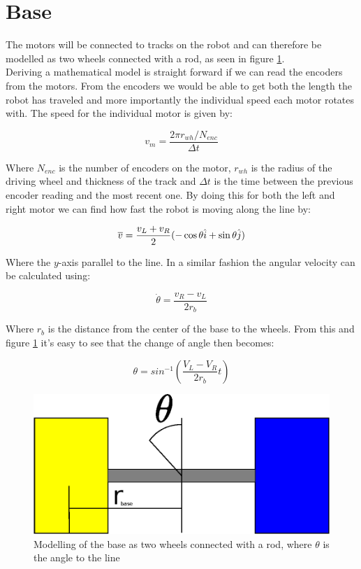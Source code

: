 \section*{Base}

The motors will be connected to tracks on the robot and can therefore be modelled as two wheels connected with a rod, as seen in figure \ref{fig:base_math_model}.\\ 
Deriving a mathematical model is straight forward if we can read the encoders from the motors. From the encoders we would be able to get both the length the robot has traveled and more importantly the individual speed each motor rotates with. The speed for the individual motor is given by: 

\begin{equation}
    v_m=\frac{2\pi r_{wh}/N_{enc}}{\Delta t}
    \label{eq:base_system_eq1}
\end{equation}

\noindent Where $N_{enc}$ is the number of encoders on the motor, $r_{wh}$ is the radius of the driving wheel and thickness of the track and $\Delta t$ is the time between the previous encoder reading and the most recent one. By doing this for both the left and right motor we can find how fast the robot is moving along the line by:

\begin{equation}
    \overline{v}= \frac{v_L+v_R}{2}(-\cos \theta \hat{i}+ \sin \theta \Hat{j})
\end{equation}

\noindent Where the $y$-axis parallel to the line. In a similar fashion the angular velocity can be calculated using:

\begin{equation}
    \Dot{\theta} = \frac{v_R-v_L}{2r_{b}}
    \label{eq:base_system_eq2}
\end{equation}

\noindent Where $r_{b}$ is the distance from the center of the base to the wheels. From this and figure \ref{fig:base_math_model} it's easy to see that the change of angle then becomes:

\begin{equation}
    \theta = sin^{-1}\left(\frac{V_L-V_R}{2r_{b}}t\right)
\end{equation}

\begin{figure}[H]
    \centering
    \includegraphics[width=0.7\columnwidth]{chapters/img/base_math_model.eps}
    \caption{Modelling of the base as two wheels connected with a rod, where $\theta$ is the angle to the line}
    \label{fig:base_math_model}
\end{figure}

